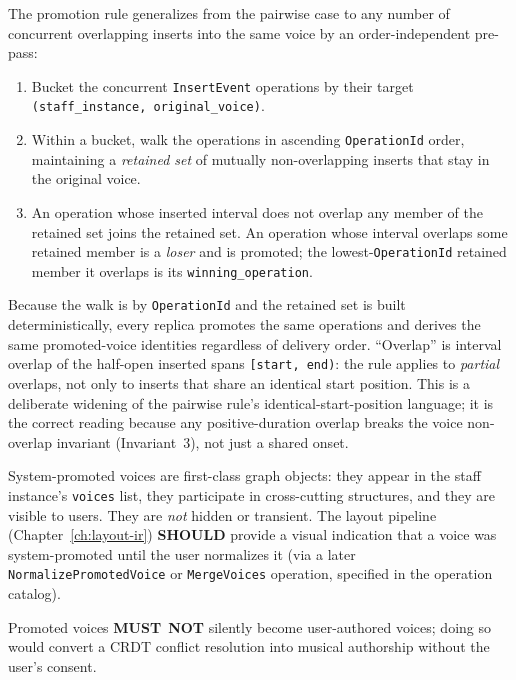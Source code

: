 \documentclass[11pt,letterpaper]{report}
\newcounter{requirement}[chapter]
\newcommand{\MUSTNOT}{\textbf{MUST}\nobreak\ \textbf{NOT}}
\newcommand{\SHOULD}{\textbf{SHOULD}}
\begin{document}
\begin{requirement}
  \label{req:graph:promotion-generalization}
  The promotion rule generalizes from the pairwise case to any number
  of concurrent overlapping inserts into the same voice by an
  order-independent pre-pass:

  \begin{enumerate}
    \item Bucket the concurrent \texttt{InsertEvent} operations by
      their target \texttt{(staff\_instance, original\_voice)}.
    \item Within a bucket, walk the operations in ascending
      \texttt{OperationId} order, maintaining a \emph{retained set} of
      mutually non-overlapping inserts that stay in the original voice.
    \item An operation whose inserted interval does not overlap any
      member of the retained set joins the retained set. An operation
      whose interval overlaps some retained member is a \emph{loser}
      and is promoted; the lowest-\texttt{OperationId} retained member
      it overlaps is its \texttt{winning\_operation}.
  \end{enumerate}

  Because the walk is by \texttt{OperationId} and the retained set is
  built deterministically, every replica promotes the same operations
  and derives the same promoted-voice identities regardless of
  delivery order. ``Overlap'' is interval overlap of the half-open
  inserted spans \texttt{[start,\,end)}: the rule applies to
  \emph{partial} overlaps, not only to inserts that share an identical
  start position. This is a deliberate widening of the pairwise rule's
  identical-start-position language; it is the correct reading because
  any positive-duration overlap breaks the voice non-overlap invariant
  (Invariant~3), not just a shared onset.
\end{requirement}

\begin{requirement}
  \label{req:graph:promoted-voice-visibility}
  System-promoted voices are first-class graph objects: they appear
  in the staff instance's \texttt{voices} list, they participate in
  cross-cutting structures, and they are visible to users. They are
  \emph{not} hidden or transient. The layout pipeline
  (Chapter~\ref{ch:layout-ir}) \SHOULD{} provide a visual indication
  that a voice was system-promoted until the user normalizes it
  (via a later \texttt{NormalizePromotedVoice} or
  \texttt{MergeVoices} operation, specified in the operation
  catalog).

  Promoted voices \MUSTNOT{} silently become user-authored voices;
  doing so would convert a CRDT conflict resolution into musical
  authorship without the user's consent.
\end{requirement}
\end{document}
